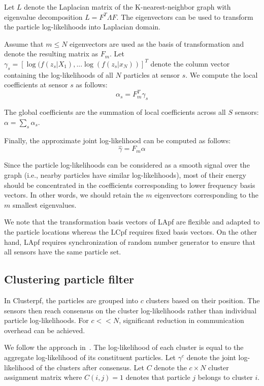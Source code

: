 \documentclass[10pt,letterpaper,final]{article}
\begin{document}
Let $L$ denote the Laplacian matrix of the K-nearest-neighbor graph with eigenvalue decomposition $L=F^T\Lambda F$. The eigenvectors can be used to transform the particle log-likelihoods into Laplacian domain.

Assume that $m\leq N$ eigenvectors are used as the basis of transformation and denote the resulting matrix as $F_m$. Let $\gamma_s = [\log (f(z_s|X_1), ... \log (f(z_s|x_N))]^T$ denote the column vector containing the log-likelihoods of all $N$ particles at sensor $s$. We compute the local coefficients at sensor $s$ as follows:
\begin{equation}
\alpha_s = F_m^T\gamma_s
\end{equation}

The global coefficients are the summation of local coefficients across all $S$ sensors: $\alpha = \sum_s \alpha_s$. 

Finally, the approximate joint log-likelihood can be computed as follows:
\begin{equation}
\hat{\gamma} = F_m\alpha
\end{equation}

Since the particle log-likelihoods can be considered as a smooth signal over the graph (i.e., nearby particles have similar log-likelihoods), most of their energy should be concentrated in the coefficients corresponding to lower frequency basis vectors. In other words, we should retain the $m$ eigenvectors corresponding to the $m$ smallest eigenvalues. 

We note that the transformation basis vectors of LApf are flexible and adapted to the particle locations whereas the LCpf requires fixed basis vectors. On the other hand, LApf requires synchronization of random number generator to ensure that all sensors have the same particle set. 

\subsection{Clustering particle filter}
\label{sec:evaluation}
In Clusterpf, the particles are grouped into $c$ clusters based on their position. The sensors then reach consensus on the cluster log-likelihoods rather than individual particle log-likelihoods. For $c << N$, significant reduction in communication overhead can be achieved. 

We follow the approach in~\cite{}. The log-likelihood of each cluster is equal to the aggregate log-likelihood of its constituent particles. Let $\gamma^c$ denote the joint log-likelihood of the clusters after consensus. Let $C$ denote the $c \times N$ cluster assignment matrix where $C(i,j)=1$ denotes that particle $j$ belongs to cluster $i$. 
\end{document}
